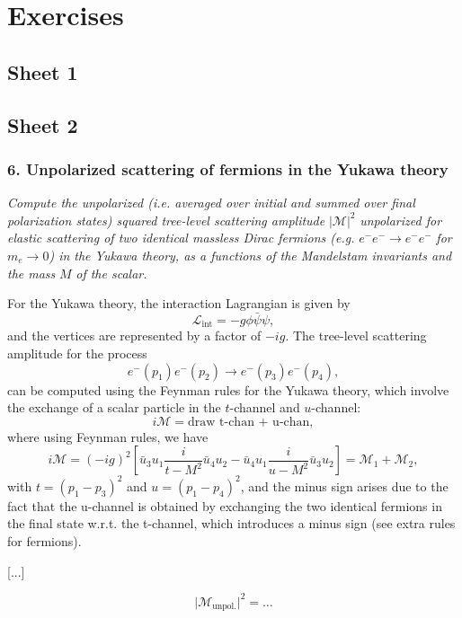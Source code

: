 \chapter{Exercises}

\section*{Sheet 1}

\section*{Sheet 2}

\subsection*{6. Unpolarized scattering of fermions in the Yukawa theory}

\begin{center}
    \textit{Compute the unpolarized (i.e. averaged over initial and summed over final polarization states) squared tree-level scattering amplitude} \(\vert \mathcal{M} \vert^2\) \textit{unpolarized for elastic scattering of two identical massless Dirac fermions (e.g.} \(e^- e^- \to e^- e^-\) \textit{for} \(m_e \to 0\)\textit{) in the Yukawa theory, as a functions of the Mandelstam invariants and the mass} \(M\) \textit{of the scalar.}
\end{center}

For the Yukawa theory, the interaction Lagrangian is given by
\[
    \mathcal{L}_{\text{int}} = -g \phi \bar{\psi} \psi,
\]
and the vertices are represented by a factor of \(-ig\). The tree-level scattering amplitude for the process
\[
    e^-(p_1) e^-(p_2) \to e^-(p_3) e^-(p_4),
\]
can be computed using the Feynman rules for the Yukawa theory, which involve the exchange of a scalar particle in the \(t\)-channel and \(u\)-channel:
\[
    i \mathcal{M} = \text{draw t-chan + u-chan},
\]
where using Feynman rules, we have
\[
    i \mathcal{M} = (-ig)^2 \left[ \bar{u}_3 u_1 \frac{i}{t - M^2} \bar{u}_4 u_2 - \bar{u}_4 u_1 \frac{i}{u - M^2} \bar{u}_3 u_2 \right] = \mathcal{M}_1 + \mathcal{M}_2,
\]
with \(t = (p_1 - p_3)^2\) and \(u = (p_1 - p_4)^2\), and the minus sign arises due to the fact that the u-channel is obtained by exchanging the two identical fermions in the final state w.r.t. the t-channel, which introduces a minus sign (see extra rules for fermions).

    [...]

\[
    \vert \mathcal{M}_{\text{unpol.}} \vert^2 = \dots
\]

